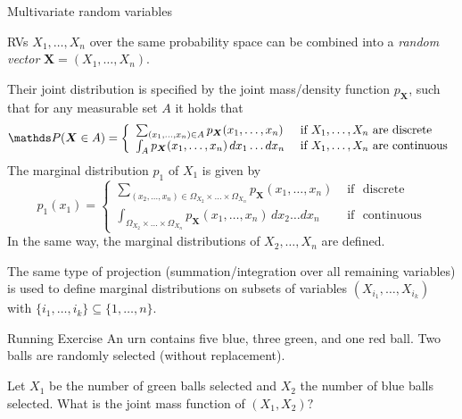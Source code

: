 \documentclass[11pt,compress,t,notes=noshow, xcolor=table]{beamer}
\begin{document}
\begin{frame}[t]{Multivariate random variables}
	
	
	RVs $X_1  , \ldots  , X_n$ over the same probability space can be combined into a \emph{random vector} $\bm{X}=(X_1, \ldots , X_n)$. 
	
	\lz
	
	Their joint distribution is specified by the joint mass/density function $p_{\bm{X}}$, such that for any measurable set $A$ it holds that
	$$ \P(\bm{X}  \in A) =  \left\{ \begin{array}{ll}
		\sum_{  (x_1 , \ldots , x_n) \in A  } p_{\bm{X}}(x_1 , \ldots , x_n) & \text{ if } X_1,\ldots,X_n \text{ are discrete} \\
		\int_{  A}   p_{\bm{X}}(x_1 , \ldots , x_n) \, dx_1\ldots dx_n& \text{ if }  X_1,\ldots,X_n  \text{ are continuous} 
	\end{array} \right.      $$ 
%
	The marginal distribution $p_1$ of $X_1$ is given by
	\[
	p_1(x_1) =  \left\{ \begin{array}{ll}
		\sum_{  (x_2 , \ldots , x_n) \in \Omega_{X_2} \times \ldots \times \Omega_{X_n}  } p_{\bm{X}}(x_1 , \ldots , x_n) & \text{ if } \text{  discrete} \\
		\int_{  \Omega_{X_2} \times \ldots \times \Omega_{X_n} }   p_{\bm{X}}(x_1 , \ldots , x_n) \, dx_2\ldots dx_n& \text{ if }   \text{  continuous} 
	\end{array} \right.     
	\]
%	
	In the same way, the marginal distributions of $X_2, \ldots , X_n$ are defined. 
%	
 
	
	The same type of projection (summation/integration over all remaining variables) is used to define marginal distributions on subsets of variables $(X_{i_1} , \ldots  , X_{i_k})$ with 
	$\{ i_1 ,  \ldots  , i_k \} \subseteq \{1 , \ldots ,  n\}$.
	
	
\end{frame}



\begin{vbframe}{Running Exercise}  
	An urn contains five blue, three green, and one red ball. Two balls are randomly selected (without replacement).
	
	\lz
	
	
	
	Let $X_1$ be the number of green balls selected and $X_2$ the number of blue balls selected. What is the joint mass function of $(X_1,X_2)?$
	
	
	
	
	
\end{vbframe}
\end{document}
